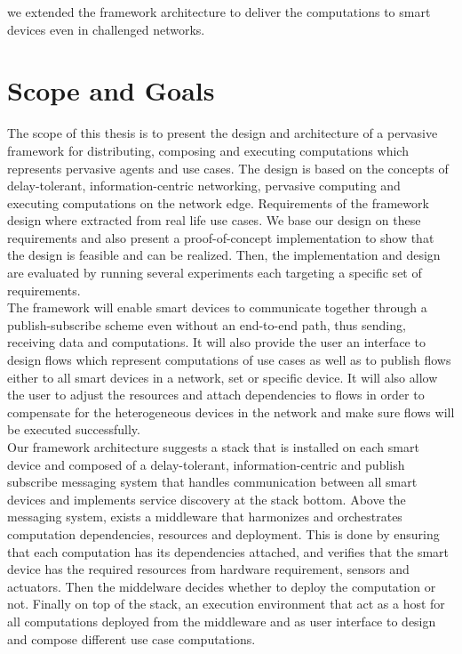 we extended the framework architecture to deliver the computations to smart devices even in challenged networks. 
 
 
\section{Scope and Goals}
The scope of this thesis is to present the design and architecture of a pervasive  framework for distributing, composing and executing computations which represents pervasive agents and use cases. The design is based on the concepts of delay-tolerant, information-centric networking, pervasive computing and executing computations on the network edge. Requirements of the framework design where extracted from real life use cases. We base our design on these requirements and also present a proof-of-concept implementation to show that the design is feasible and can be realized. Then, the implementation and design are evaluated by running several experiments each targeting a specific set of requirements.\\
	

\noindent The framework will enable smart devices to communicate together through a publish-subscribe scheme even without an end-to-end path, thus sending, receiving data and computations.  It will also provide the user  an interface to design flows which represent computations of use cases as well as to publish flows either to all smart devices in a network, set or specific device. It will also allow the user to adjust the resources and attach dependencies to flows in order to compensate for the heterogeneous devices in the network and make sure flows will be executed successfully.\\

\noindent Our framework architecture  suggests a stack that is installed on each smart device and composed of a delay-tolerant, information-centric and publish subscribe messaging system that handles communication between all smart devices and implements service discovery at the stack bottom. Above the messaging system, exists a middleware that harmonizes and orchestrates computation dependencies, resources and deployment. This is done by ensuring that each computation has its dependencies attached, and verifies that the smart device has the required resources from hardware requirement, sensors and actuators.  Then the middelware decides whether to deploy the computation or not. Finally on top of the stack, an execution environment that act as a host for all computations deployed from the middleware and as user interface to design and compose different use case computations.

